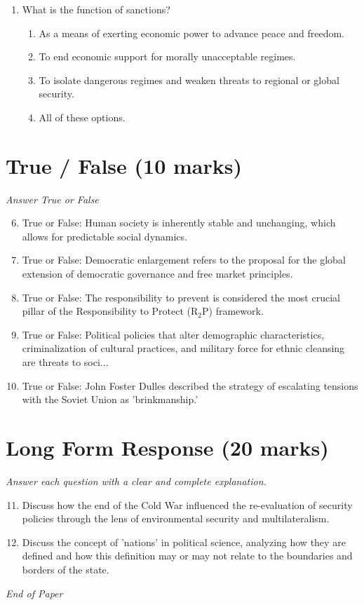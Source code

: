 \documentclass[12pt]{article}
\begin{document}
\begin{enumerate}[label=\arabic*.]
\begin{enumerate}[label=(\alph*)]
    \item The president consulting Congress on foreign policy issues
    \item Bilateral talks that do not involve a third-party negotiator
\end{enumerate}
\item What is the function of sanctions?
\begin{enumerate}[label=(\alph*)]
    \item As a means of exerting economic power to advance peace and freedom.
    \item To end economic support for morally unacceptable regimes.
    \item To isolate dangerous regimes and weaken threats to regional or global security.
    \item All of these options.
\end{enumerate}
\end{enumerate}

\section*{True / False (10 marks)}
\textit{Answer True or False}
\begin{enumerate}[label=\arabic*.]
\setcounter{enumi}{5}
\item True or False: Human society is inherently stable and unchanging, which allows for predictable social dynamics.
\item True or False: Democratic enlargement refers to the proposal for the global extension of democratic governance and free market principles.
\item True or False: The responsibility to prevent is considered the most crucial pillar of the Responsibility to Protect (R$_{2}$P) framework.
\item True or False: Political policies that alter demographic characteristics, criminalization of cultural practices, and military force for ethnic cleansing are threats to soci...
\item True or False: John Foster Dulles described the strategy of escalating tensions with the Soviet Union as 'brinkmanship.'
\end{enumerate}

\section*{Long Form Response (20 marks)}
\textit{Answer each question with a clear and complete explanation.}
\begin{enumerate}[label=\arabic*.]
\setcounter{enumi}{10}
\item Discuss how the end of the Cold War influenced the re-evaluation of security policies through the lens of environmental security and multilateralism.
\item Discuss the concept of 'nations' in political science, analyzing how they are defined and how this definition may or may not relate to the boundaries and borders of the state.
\end{enumerate}

\vfill
\noindent\textit{End of Paper}
\end{document}
